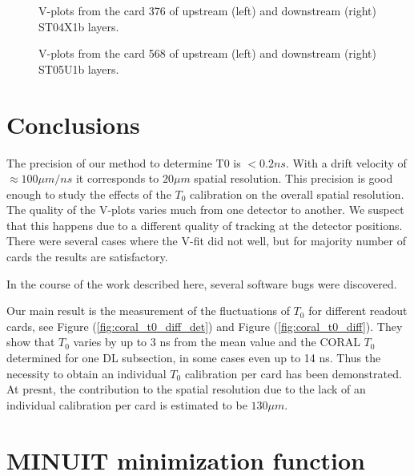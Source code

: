 \documentclass[a4paper,12pt]{article}
\begin{document}
\begin{figure}[ht]
\centering
\caption{V-plots from the card 376 of upstream (left) and downstream (right) ST04X1b layers.}
\label{fig:Vs_ST04X1b_card376}
\epsfxsize=255pt 
\end{figure}

\begin{figure}[ht]
\centering
\caption{V-plots from the card 568 of upstream (left) and downstream (right) ST05U1b layers.}
\label{fig:Vs_ST05U1b_card568}
\epsfxsize=255pt 
\end{figure}


\clearpage
\section{Conclusions}

The precision of our  method  to determine T0 is
$<0.2 ns$. With a  drift velocity of $\approx 100\mu m /ns$ it corresponds to $20\mu m$
spatial resolution. This precision is good enough to study the effects of the $T_0$
calibration on the overall  spatial resolution.
The quality of the V-plots varies much from one detector to another. We suspect that this happens
due to a different quality of tracking at the detector positions.
There were several cases where the V-fit did not well, but for majority number of cards
the results are satisfactory.

In the course of the  work described here, several software bugs were discovered.
 
Our main result is the measurement of the fluctuations of $T_0$  for different readout cards,
see Figure (\ref{fig:coral_t0_diff_det}) and Figure (\ref{fig:coral_t0_diff}).
They show that $T_0$ varies by up to 3 ns from the mean value  and the CORAL $T_0$ determined
for one DL subsection, in  some cases  even up to 14 ns. Thus the necessity to obtain an
individual $T_0$ calibration per card has been demonstrated. At presnt, the contribution to the
spatial resolution due to the lack of an individual calibration per card is estimated to
be $130 \mu m$.

\appendix

\clearpage
\section{MINUIT minimization function}
\label{sec:minimization function}
\end{document}
